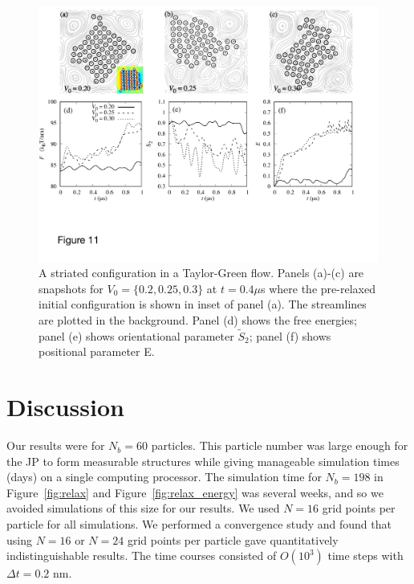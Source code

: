 \documentclass[prb,preprint,showpacs,preprintnumbers,amsmath,amssymb,longbibliography]{revtex4-1}
\begin{document}
\begin{figure}
  \begin{center}
\includegraphics[width=1.0\textwidth]{Figures/Figure11.pdf}            
  \end{center}
  \vspace{-20pt}  
  \caption{\label{fig:BC3_TG} A striated configuration in a Taylor-Green
  flow. Panels (a)-(c) are snapshots for $V_0=\{0.2, 0.25, 0.3\}$ at
  $t=0.4\mu$s where the pre-relaxed initial configuration is shown in
  inset of panel (a). The streamlines are plotted in the background.
  Panel (d) shows the free energies; panel (e) shows orientational
  parameter $\tilde{S}_2$; panel (f) shows positional parameter E.}
\end{figure}



\section{Discussion}
Our results were for $N_b = 60$ particles. This particle number was
large enough for the JP to form measurable structures while giving
manageable simulation times (days) on a single computing processor. The
simulation time for $N_b = 198$ in Figure~\ref{fig:relax} and
Figure~\ref{fig:relax_energy} was several weeks, and so we avoided
simulations of this size for our results. We used $N = 16$ grid points
per particle for all simulations. We performed a convergence study and
found that using $N = 16$ or $N = 24$ grid points per particle gave
quantitatively indistinguishable results. The time courses consisted of
$O(10^3)$ time steps with $\Delta t = 0.2$ nm.
\end{document}
